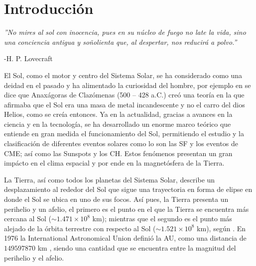 \chapter{Introducción} 


\begin{flushright}
\textit{''No mires al sol con inocencia, pues en su núcleo de fuego no late la vida, sino una conciencia antigua y soñolienta que, al despertar, nos reducirá a polvo.''}

-H. P. Lovecraft
\end{flushright}

El Sol, como el motor y centro del Sistema Solar, se ha considerado como una deidad en el pasado y ha alimentado la curiosidad del hombre, por ejemplo en \textcite[][]{2010anaxagoras} se dice que Anaxágoras de Clazómenas (500 – 428 a.C.) creó una teoría en la que afirmaba que el Sol era una masa de metal incandescente y no el carro del dios Helios, como se creía entonces. Ya en la actualidad, gracias a avances en la ciencia y en la tecnología, se ha desarrollado un enorme marco teórico que entiende en gran medida el funcionamiento del Sol, permitiendo el estudio y la clasificación de diferentes eventos solares como lo son las \ac{SF} y los eventos de \ac{CME}; así como las \ac{Sunspots} y los \ac{CH}. Estos fenómenos presentan un gran impácto en el clima espacial y por ende en la magnetósfera de la Tierra.

La Tierra, así como todos los planetas del Sistema Solar, describe un desplazamiento al rededor del Sol que sigue una trayectoria en forma de elipse en donde el Sol se ubica en uno de sus focos. Así pues, la Tierra presenta un perihelio y un afelio, el primero es el punto en el que la Tierra se encuentra más cercana al Sol ($\sim 1.471 \times 10^{8}$ km); mientras que el segundo es el punto más alejado de la órbita terrestre con respecto al Sol ($\sim 1.521\times10^{8}$ km), según \textcite[e.g.,][]{hughes-2024}. En 1976 la International Astronomical Union definió la \ac{AU}, como una distancia de $149597870$ km \parencite[e.g.,][]{stix-2002, standish-2004}, siendo una cantidad que se encuentra entre la magnitud del perihelio y el afelio.

